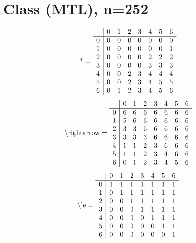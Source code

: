 \documentclass[11pt]{article}
\begin{document}
\section{Class (MTL), n=252}
\[\text{*} = 
\begin{array}{r | r r r r r r r}
 & 0 & 1 & 2 & 3 & 4 & 5 & 6 \\ \hline
0 & 0 & 0 & 0 & 0 & 0 & 0 & 0 \\
1 & 0 & 0 & 0 & 0 & 0 & 0 & 1 \\
2 & 0 & 0 & 0 & 0 & 2 & 2 & 2 \\
3 & 0 & 0 & 0 & 0 & 3 & 3 & 3 \\
4 & 0 & 0 & 2 & 3 & 4 & 4 & 4 \\
5 & 0 & 0 & 2 & 3 & 4 & 5 & 5 \\
6 & 0 & 1 & 2 & 3 & 4 & 5 & 6 \\
\end{array}
\]
\[\text{\textbackslash rightarrow} = 
\begin{array}{r | r r r r r r r}
 & 0 & 1 & 2 & 3 & 4 & 5 & 6 \\ \hline
0 & 6 & 6 & 6 & 6 & 6 & 6 & 6 \\
1 & 5 & 6 & 6 & 6 & 6 & 6 & 6 \\
2 & 3 & 3 & 6 & 6 & 6 & 6 & 6 \\
3 & 3 & 3 & 3 & 6 & 6 & 6 & 6 \\
4 & 1 & 1 & 2 & 3 & 6 & 6 & 6 \\
5 & 1 & 1 & 2 & 3 & 4 & 6 & 6 \\
6 & 0 & 1 & 2 & 3 & 4 & 5 & 6 \\
\end{array}
\]
\[\text{\textbackslash le} = 
\begin{array}{r | r r r r r r r}
 & 0 & 1 & 2 & 3 & 4 & 5 & 6 \\ \hline
0 & 1 & 1 & 1 & 1 & 1 & 1 & 1 \\
1 & 0 & 1 & 1 & 1 & 1 & 1 & 1 \\
2 & 0 & 0 & 1 & 1 & 1 & 1 & 1 \\
3 & 0 & 0 & 0 & 1 & 1 & 1 & 1 \\
4 & 0 & 0 & 0 & 0 & 1 & 1 & 1 \\
5 & 0 & 0 & 0 & 0 & 0 & 1 & 1 \\
6 & 0 & 0 & 0 & 0 & 0 & 0 & 1 \\
\end{array}
\]
\end{document}
